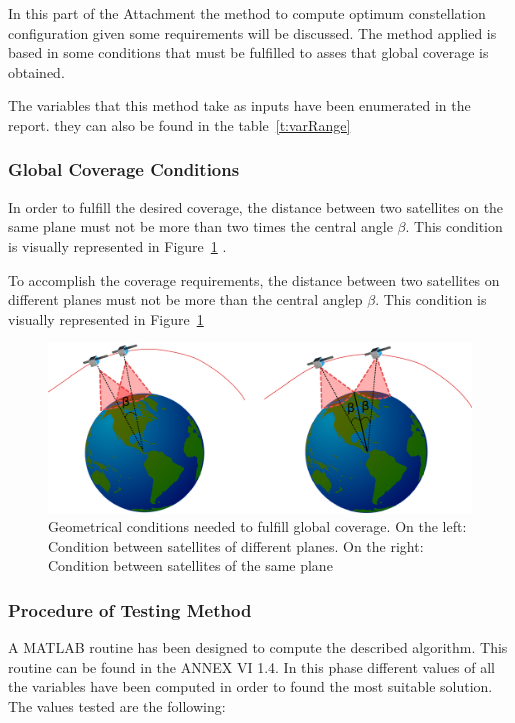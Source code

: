 In this part of the Attachment the method to compute optimum constellation configuration given some requirements will be discussed. The method applied is based in some conditions that must be fulfilled to asses that global coverage is obtained.

The variables that this method take as inputs have been enumerated in the report. they can also be found in the table~\ref{t:varRange}

\subsubsection{Global Coverage Conditions}

In order to fulfill the desired coverage, the distance between two satellites on the same plane must not be more than two times the central angle $\beta$. This condition is visually represented in Figure~\ref{fig:ConditionGCoverage} .

To accomplish the coverage requirements, the distance between two satellites on different planes must not be more than the central anglep $\beta$. This condition is visually represented in Figure~\ref{fig:ConditionGCoverage} 

\begin{figure}[H] %
	\centering
	\includegraphics[width=.8\textwidth]{./testing/ConditionGCoverage.png}
	\caption[Geometrical conditions needed to fulfill global coverage]{Geometrical conditions needed to fulfill global coverage. On the left: Condition between satellites of different planes. On the right: Condition between satellites of the same plane}
	\label{fig:ConditionGCoverage}
\end{figure}

\subsubsection{Procedure of Testing Method}
A MATLAB routine has been designed to compute the described algorithm. This routine can be found in the ANNEX VI 1.4. In this phase different values of all the variables have been computed in order to found the most suitable solution. The values tested are the following:

